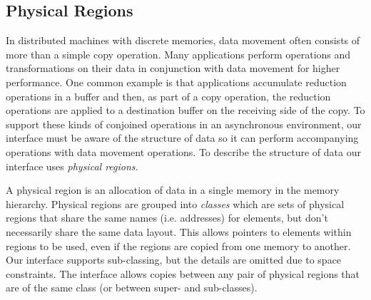\subsection{Physical Regions}
\label{subsec:phyreg}
In distributed machines with discrete memories, data movement often consists of more
than a simple copy operation.  Many applications perform operations and transformations on
their data in conjunction with data movement for higher performance.  One common example is 
that applications accumulate reduction operations in a buffer and then, as part of a copy operation,
the reduction operations are applied to a destination buffer on the receiving side of the copy.  
To support these kinds of conjoined operations in an asynchronous environment, our interface 
must be aware of the structure of data so it can perform accompanying operations with 
data movement operations.  To describe the structure of data our interface uses {\em physical regions.}

A physical region is an allocation of data in a single memory in the memory hierarchy.  Physical
regions are grouped into {\em classes} which are sets of physical regions that share the
same names (i.e. addresses) for elements, but don't necessarily share the same data layout.  This
allows pointers to elements within regions to be used, even if the regions are copied from one memory
to another.  Our
interface supports sub-classing, but the details are omitted due to space constraints.  The
interface allows copies between any pair of physical regions that are of
the same class (or between super- and sub-classes).  



